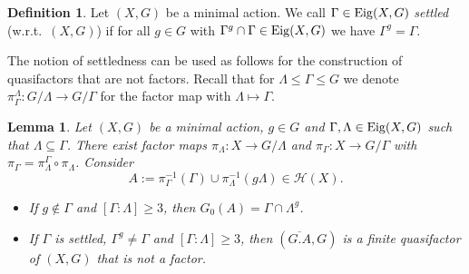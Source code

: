 \documentclass[12pt, reqno]{amsart}
\newtheorem{lemma}[theorem]{Lemma}
\theoremstyle{definition}
\newtheorem{definition}[theorem]{Definition}
\theoremstyle{remark}
\numberwithin{equation}{section}
\theoremstyle{theorem}
\theoremstyle{remark}
\def\Eig{{\rm Eig}}
\def\hyper{{\mathcal{H}}}
\begin{document}
\begin{definition}
    Let $(X,G)$ be a minimal action. 
    We call $\Gamma\in \Eig(X,G)$ \emph{settled} (w.r.t.\ $(X,G)$) if for all $g\in G$ with $\Gamma^g \cap \Gamma\in \Eig(X,G)$ we have $\Gamma^g=\Gamma$. 
\end{definition}

The notion of settledness can be used as follows for the construction of quasifactors that are not factors. 
Recall that for $\Lambda\leq \Gamma\leq G$ we denote $\pi^{\Lambda}_{\Gamma}\colon G/\Lambda\to G/\Gamma$ for the factor map with $\Lambda\mapsto \Gamma$. 

\begin{lemma}
\label{lem:quasiFactorConstruction}
    Let $(X,G)$ be a minimal action, $g\in G$ and $\Gamma,\Lambda\in \Eig(X,G)$ such that $\Lambda\subseteq \Gamma$. 
    There exist factor maps $\pi_\Lambda\colon X\to G/\Lambda$ and 
    $\pi_\Gamma\colon X\to G/\Gamma$ with $\pi_\Gamma=\pi^\Gamma_\Lambda\circ \pi_\Lambda$. 
    Consider 
    \[A := \pi_\Gamma^{-1}(\Gamma)\cup \pi_\Lambda^{-1}(g\Lambda)\in \hyper(X).\]
\begin{itemize}
    \item[(i)] If $g\notin \Gamma$ and $[\Gamma\colon \Lambda]\geq 3$, then $G_0(A)=\Gamma\cap \Lambda^g$. 
    \item[(ii)] If $\Gamma$ is settled, $\Gamma^g\neq \Gamma$ and $[\Gamma\colon \Lambda]\geq 3$, then 
    $(\overline{G.A},G)$ is a finite quasifactor of $(X,G)$ that is not a factor.
\end{itemize}
\end{lemma}
\end{document}
